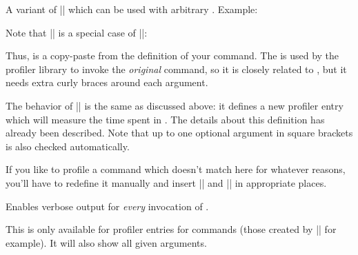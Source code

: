 \begin{command}{\pgfprofilenewforcommandpattern{}}
	A variant of |\pgfprofilenewforcommand| which can be used with arbitrary . Example:

Note that |\pgfprofilenewforcommand| is a special case of |\pgfprofilenewforcommandpattern|:
\begin{codeexample}
\def\mymacro#1#2{ ... }
\pgfprofilenewforcommand{}
\end{codeexample}
	Thus,  is a copy-paste from the definition of your command. The  is used by the profiler library to invoke the \emph{original} command, so it is closely related to , but it needs extra curly braces around each argument.

	The behavior of |\pgfprofilenewforcommandpattern| is the same as discussed above: it defines a new profiler entry which will measure the time spent in . The details about this definition has already been described. Note that up to one optional argument in square brackets is also checked automatically.
	

	If you like to profile a command which doesn't match here for whatever reasons, you'll have to redefine it manually and insert |\pgfprofilestart| and |\pgfprofileend| in appropriate places.
\end{command}

\begin{command}{\pgfprofileshowinvocationsfor{}}
	Enables verbose output for \emph{every} invocation of .

	This is only available for profiler entries for commands (those created by |\pgfprofilenewforcommand| for example). It will also show all given arguments.
\end{command}

